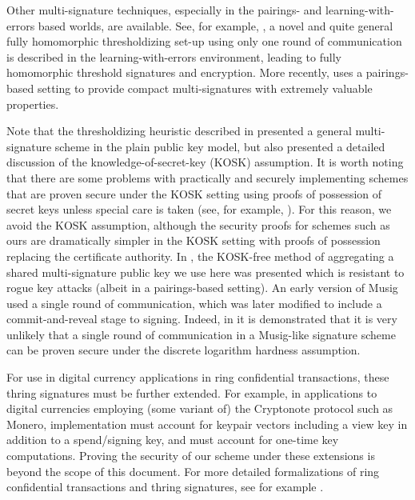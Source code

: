 \documentclass{mrl}
\theoremstyle{definition}
\numberwithin{theorem}{subsection}
\begin{document}
Other multi-signature techniques, especially in the pairings- and learning-with-errors based worlds, are available. See, for example, \cite{bonehthreshold}, a novel and quite general fully homomorphic thresholdizing set-up using only one round of communication is described in the learning-with-errors environment, leading to fully homomorphic threshold signatures and encryption.  More recently, \cite{bonehcompact} uses a pairings-based setting to provide compact multi-signatures with extremely valuable properties.

Note that the thresholdizing heuristic described in \cite{bellare2006multi} presented a general multi-signature scheme in the plain public key model, but also presented a detailed discussion of the knowledge-of-secret-key (KOSK) assumption. It is worth noting that there are some problems with practically and securely implementing schemes that are proven secure under the KOSK setting using proofs of possession of secret keys unless special care is taken (see, for example, \cite{ristenpart2007power}). For this reason, we avoid the KOSK assumption, although the security proofs for schemes such as ours are dramatically simpler in the KOSK setting with proofs of possession replacing the certificate authority. In \cite{qian2010non}, the KOSK-free method of aggregating a shared multi-signature public key we use here was presented which is resistant to rogue key attacks (albeit in a pairings-based setting).  An early version of Musig used a single round of communication, which was later modified to include a commit-and-reveal stage to signing. Indeed, in \cite{drijvers2018okamoto} it is demonstrated that it is very unlikely that a single round of communication in a Musig-like signature scheme can be proven secure under the discrete logarithm hardness assumption.  
 



For use in digital currency applications in ring confidential transactions, these thring signatures must be further extended. For example, in applications to digital currencies employing (some variant of) the Cryptonote protocol such as Monero, implementation must account for keypair vectors including a view key in addition to a spend/signing key, and must account for one-time key computations. Proving the security of our scheme under these extensions is beyond the scope of this document. For more detailed formalizations of ring confidential transactions and thring signatures, see for example \cite{ruffct2}.

 
\end{document}

